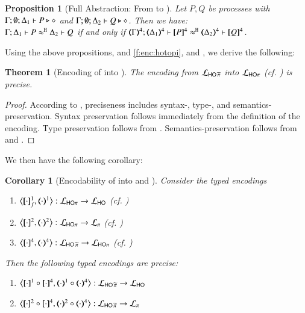 \documentclass[preprint,11pt]{elsarticle}
\newtheorem{proposition}{Proposition}[section]
\newtheorem{corollary}{Corollary}[section]
\newtheorem{theorem}{Theorem}[section]
\begin{document}
{\begin{proposition}[Full Abstraction: From \PHOp to \HOp]%
	\label{prop:fulla_pHOp_to_HOp}
	Let $P, Q$ be \PHOp processes with $\Gamma; \emptyset; \Delta_1 \vdash P \triangleright \diamond$ and 
	$\Gamma; \emptyset; \Delta_2 \vdash Q \triangleright \diamond$. Then we have: \\
	$\Gamma; \Delta_1 \vdash P \approx^\mathtt{H} \Delta_2 \vdash Q$ if and only if $\horel{\tmap{\Gamma}{4}}{\tmap{\Delta_1}{4}}{\pmap{P}{4}}{\hwb}{\tmap{\Delta_2}{4}}{\pmap{Q}{4}}$.
\end{proposition}

Using the above propositions,  
and 
\ref{f:enc:hotopi},
and , 
we derive the following: 
\begin{theorem}[Encoding of \PHOp into \HOp]
	\label{f:enc:phopiptohopi}
	The encoding from
		$\mathcal{L}_{\mathsf{HO}\,{\widetilde{\pi}}}$ into $\mathcal{L}_{\mathsf{HO}\pi}$ (cf. )
	is precise. 
\end{theorem}

\begin{proof}
According to , preciseness includes syntax-, type-, and semantics-preservation. 
Syntax preservation follows immediately from the definition of the encoding. 
Type preservation follows from 
.
Semantics-preservation follows from 	
 and 
.
\end{proof}

We then have the following corollary:

\begin{corollary}[Encodability of \PHOp into \HOp and \sessp]
\label{coro:poly}
Consider the typed encodings
\begin{enumerate}[-]
\item $\enco{\map{\cdot}^{1}_f, \mapt{\cdot}^{1} %
}: \tyl{L}_{\HOp} \to \tyl{L}_{\HO}$  (cf. )
\item $\enco{\map{\cdot}^{2}, \mapt{\cdot}^{2} %
}: \tyl{L}_{\HOp} \to \tyl{L}_{\sessp}$ (cf. )
\item $\enco{\map{\cdot}^{4}, \mapt{\cdot}^{4}}: \tyl{L}_{\PHOp} \to \tyl{L}_{\HOp}$ (cf. )
\end{enumerate}
Then the following typed encodings 	are precise:
\begin{enumerate}[-]
\item 
$\enco{\pmap{\cdot}{1} \circ \pmap{\cdot}{4}, \tmap{\cdot}{1} \circ \tmap{\cdot}{4}}: \tyl{L}_{\PHOp} \to \tyl{L}_\HO$
\item
$\enco{\pmap{\cdot}{2} \circ \pmap{\cdot}{4}, \tmap{\cdot}{2} \circ \tmap{\cdot}{4}}: \tyl{L}_{\PHOp} \to \tyl{L}_\sessp$
\end{enumerate}


\end{corollary}}
\end{document}
